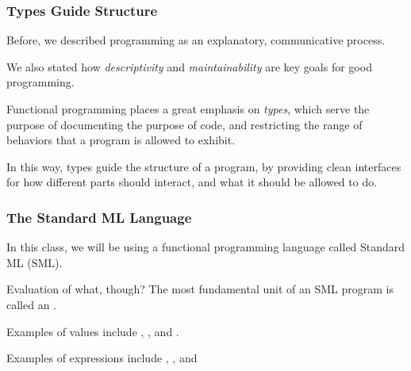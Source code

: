 \documentclass[aspectratio=169, handout]{beamer}
\begin{document}
\begin{frame}[fragile]
  \frametitle{Types Guide Structure}

  Before, we described programming as an explanatory, communicative process.

  \pause
  \vspace{\fill}

  We also stated how \textit{descriptivity} and \textit{maintainability} are
  key goals for good programming.

  \pause
  \vspace{\fill}

  Functional programming places a great emphasis on \textit{types}, which serve
  the purpose of documenting the purpose of code, and restricting the range of
  behaviors that a program is allowed to exhibit.

  \pause
  \vspace{\fill}

  In this way, types guide the structure of a program, by providing clean interfaces
  for how different parts should interact, and what it should be allowed to do.

\end{frame}


\begin{frame}[fragile]
  \frametitle{The Standard ML Language}

  In this class, we will be using a functional programming language called Standard ML (SML).

  \pause
  \vspace{10pt}


  \pause
  \vspace{\fill}

  Evaluation of what, though? The most fundamental unit of an SML program is called an .

  \pause
  \vspace{\fill}


  \pause
  \vspace{\fill}


  \pause
  \vspace{\fill}

  Examples of values include , , and .

  \vspace{5pt}

  Examples of expressions include , , and 
\end{frame}
\end{document}

